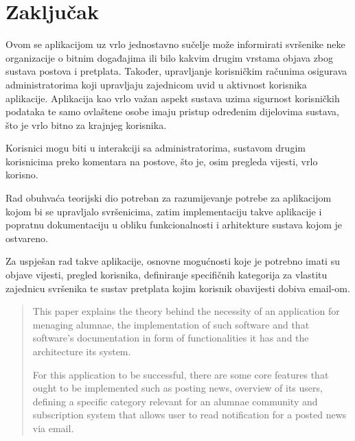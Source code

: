 \documentclass[zavrsni, numeric]{fer}
\begin{document}
\chapter{Zaključak}
Ovom se aplikacijom uz vrlo jednostavno sučelje može informirati svršenike neke organizacije o bitnim događajima ili bilo kakvim drugim vrstama objava zbog sustava postova i pretplata. Također, upravljanje korisničkim računima osigurava administratorima koji upravljaju zajednicom uvid u aktivnost korisnika aplikacije. Aplikacija kao vrlo važan aspekt sustava uzima sigurnost korisničkih podataka te samo ovlaštene osobe imaju pristup određenim dijelovima sustava, što je vrlo bitno za krajnjeg korisnika.

Korisnici mogu biti u interakciji sa administratorima, sustavom drugim korisnicima preko komentara na postove, što je, osim pregleda vijesti, vrlo korisno.




\begin{sazetak}
	Rad obuhvaća teorijski dio potreban za razumijevanje potrebe za aplikacijom kojom bi se upravljalo svršenicima, zatim implementaciju takve aplikacije i popratnu dokumentaciju u obliku funkcionalnosti i arhitekture sustava kojom je ostvareno.
	
	Za uspješan rad takve aplikacije, osnovne mogućnosti koje je potrebno imati su objave vijesti, pregled korisnika, definiranje specifičnih kategorija za vlastitu zajednicu svršenika te sustav pretplata kojim korisnik obavijesti dobiva email-om.
	
\end{sazetak}

\begin{abstract}
	This paper explains the theory behind the necessity of an application for menaging alumnae, the implementation of such software and that software's documentation in form of functionalities it has and the architecture its system.

	For this application to be successful, there are some core features that ought to be implemented such as posting news, overview of its users, defining a specific category relevant for an alumnae community and subscription system that allows user to read notification for a posted news via email.
			
\end{abstract}
\end{document}
